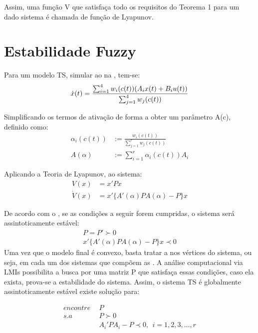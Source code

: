 Assim, uma função V que satisfaça todo os requisitos do Teorema 1 para um dado sistema é chamada de função de Lyapunov. 


\section{Estabilidade Fuzzy}
Para um modelo TS, simular ao na , tem-se:
\begin{align*}
	\dot{x}(t) = \frac{\sum_{i=1}^{4}  w_i(c(t))(A_i  x(t) +  B_i  u(t))}{\sum_{j=1}^{4} w_j(c(t))} \vspace{0.5cm}
\end{align*}

Simplificando os termos de ativação de forma a obter um parâmetro A(c), definido como:
\begin{align*}
	\alpha_i (c(t)) &:= \frac{w_i(c(t))}{\sum_{j=1}^{r}w_j(c(t))} \\
	A(\alpha) &:= \sum_{i=1}^{r} \alpha_i (c(t))A_i
\end{align*}

Aplicando a Teoria de Lyapunov, ao sistema:
\begin{align*}
	V(x) &= x' P x \\
	\dot{V}(x) &= x'\{A'(\alpha)PA(\alpha) - P\}x
\end{align*}

De acordo com o , se as condições a seguir forem cumpridas, o sistema será assintoticamente estável:
\begin{align}
	P = P' \succ 0 \\
	x'\{A'(\alpha)PA(\alpha) - P \}x \prec 0 \label{eqLyapXk}
\end{align}
Uma vez que o modelo final é convexo, basta tratar a  nos vértices do sistema, ou seja, em cada um dos sistemas que compõem as . 
A análise computacional via LMIs possibilita a busca por uma matriz P que satisfaça essas condições, caso ela exista, prova-se a estabilidade do sistema. Assim, o sistema TS é globalmente assintoticamente estável \cite{tanakaWang} existe solução para:

\begin{align}
	encontre \ \ &P \nonumber \\
	s.a \ \ &P \succ 0 \nonumber \\
	&A_i'PA_i - P \prec 0, \ \ i=1,2,3, ... , r
\end{align}

